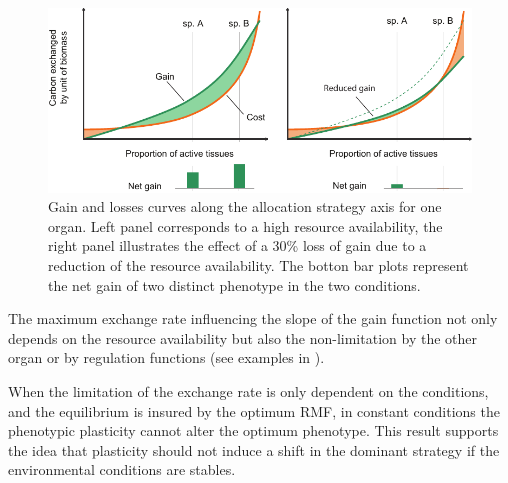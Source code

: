 \begin{figure}
\includegraphics[width = \textwidth]{./2_PP/Figures/Variable/explain_assymetry.pdf}
\caption[Optimum strategy and resource availability]{\textcolor{myGreen}{Gain} and \textcolor{myOrange}{losses} curves along the allocation strategy axis for one organ. Left panel corresponds to a high resource availability, the right panel illustrates the effect of a 30\% loss of gain due to a reduction of the resource availability. The botton bar plots represent the net gain of two distinct phenotype in the two conditions.}\label{fig:asymmetric_gain}
\end{figure}

The maximum exchange rate influencing the slope of the gain function not only depends on the resource availability but also the non-limitation by the other organ or by regulation functions (see examples in \cite{lohier_analyse_2016}).

When the limitation of the exchange rate is only dependent on the conditions, and the equilibrium is insured by the optimum RMF, in constant conditions the phenotypic plasticity cannot alter the optimum phenotype. This result supports the idea that plasticity should not induce a shift in the dominant strategy if the environmental conditions are stables.



